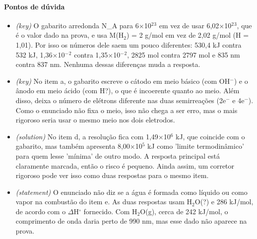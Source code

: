 \documentclass{article}%
\begin{document}
\paragraph{Pontos de dúvida}%
\begin{itemize}%
\item%
\textit{(key)} O gabarito arredonda N\_A para 6$\times$10$^2$$^3$ em vez de usar 6,02$\times$10$^2$$^3$, que é o valor dado na prova, e usa M(H$_{2}$) = 2 g/mol em vez de 2,02 g/mol (H = 1,01). Por isso os números dele saem um pouco diferentes: 530,4 kJ contra 532 kJ, 1,36$\times$10$^{-}$$^2$ contra 1,35$\times$10$^{-}$$^2$, 2825 mol contra 2797 mol e 835 nm contra 837 nm. Nenhuma dessas diferenças muda a resposta.%
\item%
\textit{(key)} No item a, o gabarito escreve o cátodo em meio básico (com OH$^{-}$) e o ânodo em meio ácido (com H?), o que é incoerente quanto ao meio. Além disso, deixa o número de elétrons diferente nas duas semirreações (2e$^{-}$ e 4e$^{-}$). Como o enunciado não fixa o meio, isso não chega a ser erro, mas o mais rigoroso seria usar o mesmo meio nos dois eletrodos.%
\item%
\textit{(solution)} No item d, a resolução fica com 1,49$\times$10$^{6}$ kJ, que coincide com o gabarito, mas também apresenta 8,00$\times$10$^{5}$ kJ como 'limite termodinâmico' para quem lesse 'mínima' de outro modo. A resposta principal está claramente marcada, então o risco é pequeno. Ainda assim, um corretor rigoroso pode ver isso como duas respostas para o mesmo item.%
\item%
\textit{(statement)} O enunciado não diz se a água é formada como líquido ou como vapor na combustão do item e. As duas respostas usam H$_{2}$O(?) e 286 kJ/mol, de acordo com o $\Delta$H$^\circ$ fornecido. Com H$_{2}$O(g), cerca de 242 kJ/mol, o comprimento de onda daria perto de 990 nm, mas esse dado não aparece na prova.%
\end{itemize}%
\end{document}
